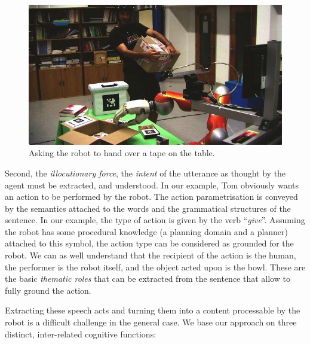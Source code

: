\begin{figure}%
    \centering
    \includegraphics[width=0.9\linewidth]{images/dialogs/pt.jpg}
    \caption{Asking the robot to hand over a tape on the table.}
    \label{fig|vpt}
\end{figure}

Second, the \emph{illocutionary force}, \ie the \emph{intent} of the utterance
as thought by the agent must be extracted, and understood. In our example, Tom
obviously wants an action to be performed by the robot. The action
parametrisation is conveyed by the semantics attached to the words and the
grammatical structures of the sentence. In our example, the type of action is
given by the verb ``\textit{give}''. Assuming the robot has some procedural
knowledge (a planning domain and a planner) attached to this symbol, the action
type can be considered as grounded for the robot. We can as well understand
that the recipient of the action is the human, the performer is the robot
itself, and the object acted upon is the bowl. These are the basic
\emph{thematic roles} that can be extracted from the sentence that allow to
fully ground the action.

Extracting these speech acts and turning them into a content processable by the
robot is a difficult challenge in the general case. We base our approach on
three distinct, inter-related cognitive functions:

